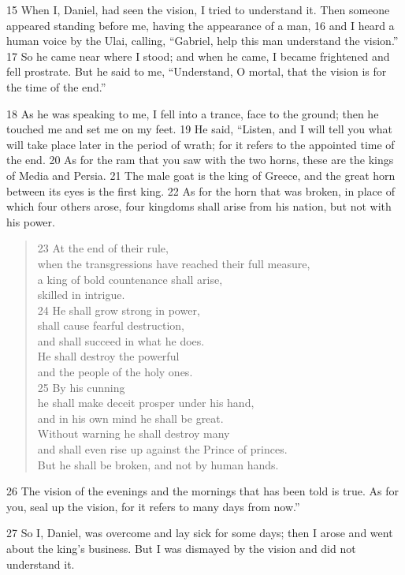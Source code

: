 15 When I, Daniel, had seen the vision, I tried to understand it. Then someone 
appeared standing before me, having the appearance of a man, 16 and I heard a 
human voice by the Ulai, calling, ``Gabriel, help this man understand the 
vision.'' 17 So he came near where I stood; and when he came, I became 
frightened and fell prostrate. But he said to me, ``Understand, O mortal, that 
the vision is for the time of the end.''

18 As he was speaking to me, I fell into a trance, face to the ground; then he 
touched me and set me on my feet. 19 He said, ``Listen, and I will tell you 
what will take place later in the period of wrath; for it refers to the 
appointed time of the end. 20 As for the ram that you saw with the two horns, 
these are the kings of Media and Persia. 21 The male goat is the king of Greece,
and the great horn between its eyes is the first king. 22 As for the horn that 
was broken, in place of which four others arose, four kingdoms shall arise from 
his nation, but not with his power.

\begin{verse}
23 At the end of their rule, \\
       \hspace{1.5em}    when the transgressions have reached their full measure, \\
a king of bold countenance shall arise, \\
\hspace{1.5em}    skilled in intrigue. \\
24 He shall grow strong in power, \\
\hspace{1.5em}    shall cause fearful destruction, \\
\hspace{1.5em}    and shall succeed in what he does. \\
He shall destroy the powerful \\
\hspace{1.5em}    and the people of the holy ones. \\
25 By his cunning \\
\hspace{1.5em}    he shall make deceit prosper under his hand, \\
\hspace{1.5em}    and in his own mind he shall be great. \\
Without warning he shall destroy many \\
\hspace{1.5em}    and shall even rise up against the Prince of princes. \\
But he shall be broken, and not by human hands. \\
\end{verse}

26 The vision of the evenings and the mornings that has been told is true. As 
for you, seal up the vision, for it refers to many days from now.''

27 So I, Daniel, was overcome and lay sick for some days; then I arose and went 
about the king's business. But I was dismayed by the vision and did not 
understand it.
